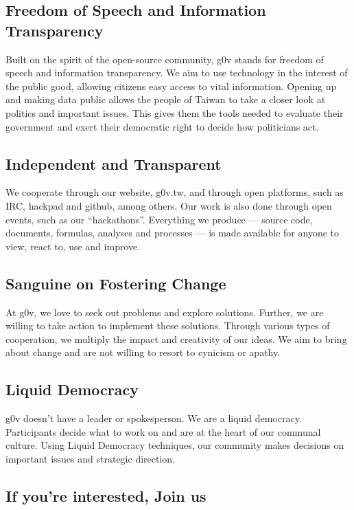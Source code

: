 \subsection{Freedom of Speech and Information Transparency}

Built on the spirit of the open-source community, g0v stands for freedom of speech and information transparency. We aim to use technology in the interest of the public good, allowing citizens easy access to vital information. Opening up and making data public allows the people of Taiwan to take a closer look at politics and important issues. This gives them the tools needed to evaluate their government and exert their democratic right to decide how politicians act.

\subsection{Independent and Transparent}

We cooperate through our website, g0v.tw, and through open platforms, such as IRC, hackpad and github, among others. Our work is also done through open events, such as our “hackathons”. Everything we produce — source code, documents, formulas, analyses and processes — is made available for anyone to view, react to, use and improve.

\subsection{Sanguine on Fostering Change}

At g0v, we love to seek out problems and explore solutions. Further, we are willing to take action to implement these solutions. Through various types of cooperation, we multiply the impact and creativity of our ideas. We aim to bring about change and are not willing to resort to cynicism or apathy.

\subsection{Liquid Democracy}

g0v doesn’t have a leader or spokesperson. We are a liquid democracy. Participants decide what to work on and are at the heart of our communal culture. Using Liquid Democracy techniques, our community makes decisions on important issues and strategic direction.

\subsection{If you’re interested, Join us}


